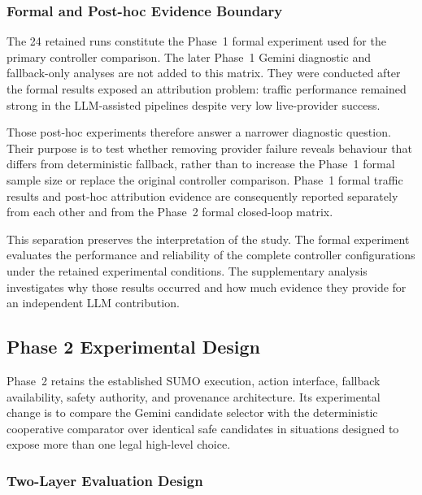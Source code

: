 \documentclass[letterpaper,10pt,conference]{ieeeconf}
\begin{document}
\subsubsection{Formal and Post-hoc Evidence Boundary}



The 24 retained runs constitute the Phase~1 formal experiment used for the primary controller comparison. The later Phase~1 Gemini diagnostic and fallback-only analyses are not added to this matrix. They were conducted after the formal results exposed an attribution problem: traffic performance remained strong in the LLM-assisted pipelines despite very low live-provider success.



Those post-hoc experiments therefore answer a narrower diagnostic question. Their purpose is to test whether removing provider failure reveals behaviour that differs from deterministic fallback, rather than to increase the Phase~1 formal sample size or replace the original controller comparison. Phase~1 formal traffic results and post-hoc attribution evidence are consequently reported separately from each other and from the Phase~2 formal closed-loop matrix.



This separation preserves the interpretation of the study. The formal experiment evaluates the performance and reliability of the complete controller configurations under the retained experimental conditions. The supplementary analysis investigates why those results occurred and how much evidence they provide for an independent LLM contribution.



\subsection{Phase 2 Experimental Design}



Phase~2 retains the established SUMO execution, action interface, fallback availability, safety authority, and provenance architecture. Its experimental change is to compare the Gemini candidate selector with the deterministic cooperative comparator over identical safe candidates in situations designed to expose more than one legal high-level choice.



\subsubsection{Two-Layer Evaluation Design}
\end{document}
